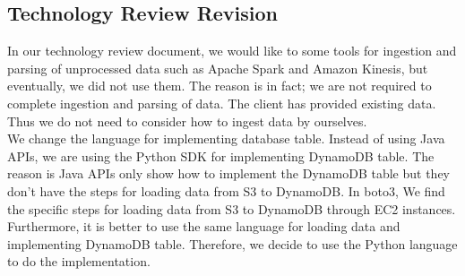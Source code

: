 \subsection{Technology Review Revision}
\noindent In our technology review document, we would like to some tools for ingestion and parsing of unprocessed data such as Apache Spark and Amazon Kinesis, but eventually, we did not use them. The reason is in fact; we are not required to complete ingestion and parsing of data. The client has provided existing data. Thus we do not need to consider how to ingest data by ourselves.\\

\noindent We change the language for implementing database table. Instead of using Java APIs, we are using the Python SDK for implementing DynamoDB table. The reason is Java APIs only show how to implement the DynamoDB table but they don't have the steps for loading data from S3 to DynamoDB. In boto3, We find the specific steps for loading data from S3 to DynamoDB through EC2 instances. Furthermore, it is better to use the same language for loading data and implementing DynamoDB table. Therefore, we decide to use the Python language to do the implementation.\\